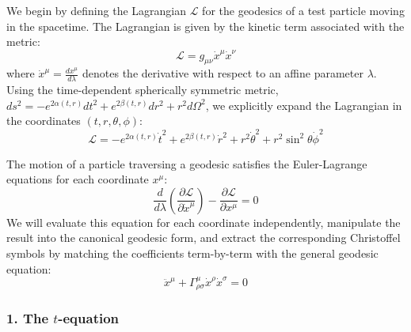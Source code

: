 \documentclass[11pt, a4paper]{report}
\begin{document}
We begin by defining the Lagrangian $\mathcal{L}$ for the geodesics of a test particle moving in the spacetime. The Lagrangian is given by the kinetic term associated with the metric:
\begin{equation}
    \mathcal{L} = g_{\mu\nu} \dot{x}^\mu \dot{x}^\nu
\end{equation}
where $\dot{x}^\mu = \frac{dx^\mu}{d\lambda}$ denotes the derivative with respect to an affine parameter $\lambda$. Using the time-dependent spherically symmetric metric, $ds^2 = -e^{2\alpha(t,r)} dt^2 + e^{2\beta(t,r)} dr^2 + r^2 d\Omega^2$, we explicitly expand the Lagrangian in the coordinates $(t, r, \theta, \phi)$:
\begin{equation}
    \mathcal{L} = -e^{2\alpha(t,r)} \dot{t}^2 + e^{2\beta(t,r)} \dot{r}^2 + r^2 \dot{\theta}^2 + r^2 \sin^2\theta \dot{\phi}^2
\end{equation}

The motion of a particle traversing a geodesic satisfies the Euler-Lagrange equations for each coordinate $x^\mu$:
\begin{equation}
    \frac{d}{d\lambda} \left( \frac{\partial \mathcal{L}}{\partial \dot{x}^\mu} \right) - \frac{\partial \mathcal{L}}{\partial x^\mu} = 0 \label{eq:EL_general}
\end{equation}
We will evaluate this equation for each coordinate independently, manipulate the result into the canonical geodesic form, and extract the corresponding Christoffel symbols by matching the coefficients term-by-term with the general geodesic equation:
\begin{equation}
    \ddot{x}^\mu + \Gamma^\mu_{\rho\sigma} \dot{x}^\rho \dot{x}^\sigma = 0 \label{eq:geodesic_general}
\end{equation}

\subsubsection*{1. The $t$-equation}
\end{document}
